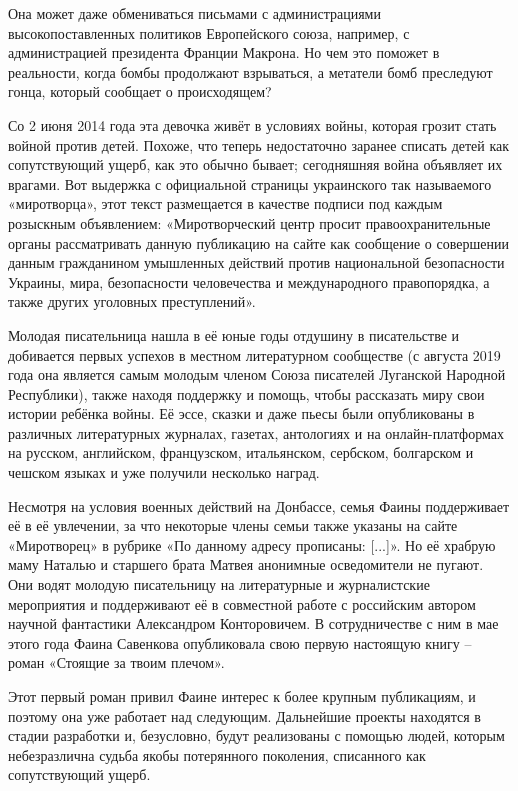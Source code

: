 Она может даже обмениваться письмами с администрациями высокопоставленных
политиков Европейского союза, например, с администрацией президента Франции
Макрона. Но чем это поможет в реальности, когда бомбы продолжают взрываться, а
метатели бомб преследуют гонца, который сообщает о происходящем?

Со 2 июня 2014 года эта девочка живёт в условиях войны, которая грозит стать
войной против детей. Похоже, что теперь недостаточно заранее списать детей как
сопутствующий ущерб, как это обычно бывает; сегодняшняя война объявляет их
врагами. Вот выдержка с официальной страницы украинского так называемого
«миротворца», этот текст размещается в качестве подписи под каждым розыскным
объявлением: «Миротворческий центр просит правоохранительные органы
рассматривать данную публикацию на сайте как сообщение о совершении данным
гражданином умышленных действий против национальной безопасности Украины, мира,
безопасности человечества и международного правопорядка, а также других
уголовных преступлений».

Молодая писательница нашла в её юные годы отдушину в писательстве и добивается
первых успехов в местном литературном сообществе (с августа 2019 года она
является самым молодым членом Союза писателей Луганской Народной Республики),
также находя поддержку и помощь, чтобы рассказать миру свои истории ребёнка
войны. Её эссе, сказки и даже пьесы были опубликованы в различных литературных
журналах, газетах, антологиях и на онлайн-платформах на русском, английском,
французском, итальянском, сербском, болгарском и чешском языках и уже получили
несколько наград.

Несмотря на условия военных действий на Донбассе, семья Фаины поддерживает её в
её увлечении, за что некоторые члены семьи также указаны на сайте «Миротворец»
в рубрике «По данному адресу прописаны: [...]». Но её храбрую маму Наталью и
старшего брата Матвея анонимные осведомители не пугают. Они водят молодую
писательницу на литературные и журналистские мероприятия и поддерживают её в
совместной работе с российским автором научной фантастики Александром
Конторовичем. В сотрудничестве с ним в мае этого года Фаина Савенкова
опубликовала свою первую настоящую книгу – роман «Стоящие за твоим плечом».

Этот первый роман привил Фаине интерес к более крупным публикациям, и поэтому
она уже работает над следующим. Дальнейшие проекты находятся в стадии
разработки и, безусловно, будут реализованы с помощью людей, которым
небезразлична судьба якобы потерянного поколения, списанного как сопутствующий
ущерб.

